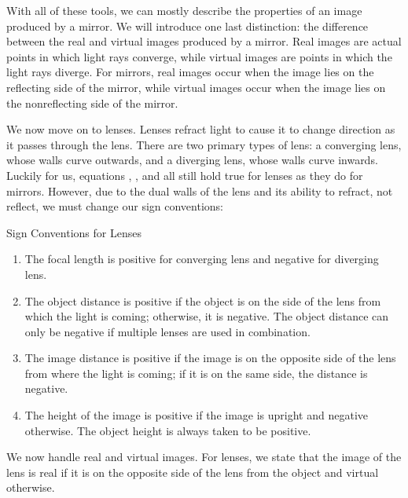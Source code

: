 \documentclass{article}
\begin{document}
\vspace{10px}
With all of these tools, we can mostly describe the properties of an image produced by a mirror. We will introduce one last distinction: the difference between the real and virtual images produced by a mirror. Real images are actual points in which light rays converge, while virtual images are points in which the light rays diverge. For mirrors, real images occur when the image lies on the reflecting side of the mirror, while virtual images occur when the image lies on the nonreflecting side of the mirror.

\vspace*{10px}
We now move on to lenses. Lenses refract light to cause it to change direction as it passes through the lens. There are two primary types of lens: a converging lens, whose walls curve outwards, and a diverging lens, whose walls curve inwards. Luckily for us, equations , , and  all still hold true for lenses as they do for mirrors. However, due to the dual walls of the lens and its ability to refract, not reflect, we must change our sign conventions:

\begin{thm}{Sign Conventions for Lenses}
    \begin{enumerate}
        \item The focal length is positive for converging lens and negative for diverging lens.
        \item The object distance is positive if the object is on the side of the lens from which the light is coming; otherwise, it is negative. The object distance can only be negative if multiple lenses are used in combination.
        \item The image distance is positive if the image is on the opposite side of the lens from where the light is coming; if it is on the same side, the distance is negative. 
        \item The height of the image is positive if the image is upright and negative otherwise. The object height is always taken to be positive.
    \end{enumerate}
\end{thm}

\vspace{10px}
We now handle real and virtual images. For lenses, we state that the image of the lens is real if it is on the opposite side of the lens from the object and virtual otherwise. 
\end{document}
